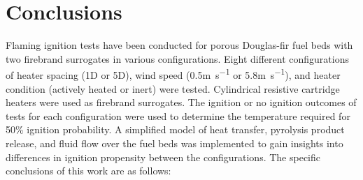 \section{Conclusions}
    Flaming ignition tests have been conducted for porous Douglas-fir fuel beds with two firebrand surrogates in various configurations. Eight different configurations of heater spacing (1D or 5D), wind speed (0.5\si{\meter\per\second} or 5.8\si{\meter\per\second}), and heater condition (actively heated or inert) were tested. Cylindrical resistive cartridge heaters were used as firebrand surrogates. The ignition or no ignition outcomes of tests for each configuration were used to determine the temperature required for 50\% ignition probability. A simplified model of heat transfer, pyrolysis product release, and fluid flow over the fuel beds was implemented to gain insights into differences in ignition propensity between the configurations. The specific conclusions of this work are as follows:
